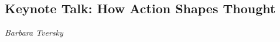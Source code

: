 \documentclass[../booklet.tex]{subfiles}
\begin{document}
\subsection[Keynote Talk: How Action Shapes Thought. {\it Barbara Tversky}]{Keynote Talk: How Action Shapes Thought}

\begin{center}
  {\it Barbara Tversky}
\end{center}

\vskip 0.8cm


% 
\end{document}

